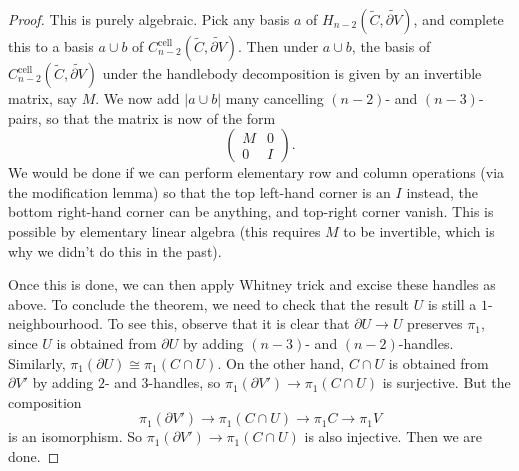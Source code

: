 \documentclass[a4paper, 12pt]{article}
\theoremstyle{definition}
\newcommand\cell{\mathrm{cell}}
\begin{document}
\begin{proof}
  This is purely algebraic. Pick any basis $a$ of $H_{n - 2}(\tilde{C}, \widetilde{\partial V})$, and complete this to a basis $a \cup b$ of $C^{\cell}_{n - 2}(\tilde{C}, \widetilde{\partial V})$. Then under $a \cup b$, the basis of $C^{\cell}_{n - 2}(\tilde{C}, \widetilde{\partial V})$ under the handlebody decomposition is given by an invertible matrix, say $M$. We now add $|a \cup b|$ many cancelling $(n - 2)$- and $(n - 3)$- pairs, so that the matrix is now of the form
  \[
    \begin{pmatrix}
      M & 0\\
      0 & I
    \end{pmatrix}.
  \]
  We would be done if we can perform elementary row and column operations (via the modification lemma) so that the top left-hand corner is an $I$ instead, the bottom right-hand corner can be anything, and top-right corner vanish. This is possible by elementary linear algebra (this requires $M$ to be invertible, which is why we didn't do this in the past).

  Once this is done, we can then apply Whitney trick and excise these handles as above. To conclude the theorem, we need to check that the result $U$ is still a $1$-neighbourhood. To see this, observe that it is clear that $\partial U \to U$ preserves $\pi_1$, since $U$ is obtained from $\partial U$ by adding $(n - 3)$- and $(n - 2)$-handles. Similarly, $\pi_1(\partial U) \cong \pi_1(C \cap U)$. On the other hand, $C \cap U$ is obtained from $\partial V'$ by adding $2$- and $3$-handles, so $\pi_1(\partial V') \to \pi_1(C\cap U)$ is surjective. But the composition
  \[
    \pi_1(\partial V') \to \pi_1(C \cap U) \to \pi_1C \to \pi_1 V
  \]
  is an isomorphism. So $\pi_1(\partial V') \to \pi_1(C \cap U)$ is also injective. Then we are done.

%
  

\end{proof}
\end{document}
